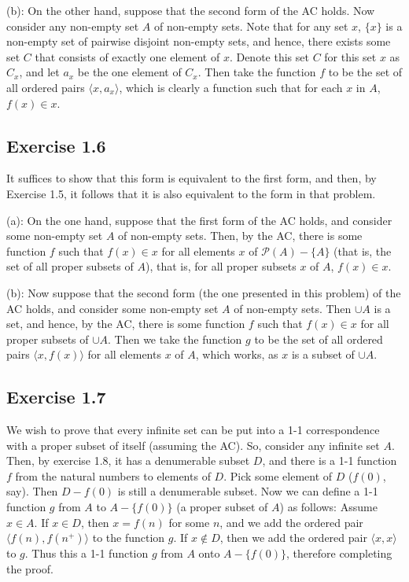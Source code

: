 \documentclass{article}
\theoremstyle{definition}
\begin{document}
(b): On the other hand, suppose that the second form of the AC holds. Now consider any non-empty set $A$ of non-empty sets. 
Note that for any set $x$, $\{x\}$ is a non-empty set of pairwise disjoint non-empty sets, and hence, there exists some set $C$ that consists of exactly one element 
of $x$. Denote this set $C$ for this set $x$ as $C_x$, and let $a_x$ be the one element of $C_x$. Then take the function $f$ to be the set of all ordered pairs
$\langle x,a_x\rangle$, which is clearly a function such that for each $x$ in $A$, $f(x)\in x$.

\subsection*{Exercise 1.6}
It suffices to show that this form is equivalent to the first form, and then, by Exercise 1.5, it follows that it is also equivalent to the form in that 
problem.

(a): On the one hand, suppose that the first form of the AC holds, and consider some non-empty set $A$ of non-empty sets. 
Then, by the AC, there is some function $f$ such that 
$f(x)\in x$ for all elements $x$ of $\mathcal{P}(A)-\{A\}$ (that is, the set of all proper subsets of $A$), that is, for all proper subsets $x$ of $A$, 
$f(x)\in x$.

(b): Now suppose that the second form (the one presented in this problem) 
of the AC holds, and consider some non-empty set $A$ of non-empty sets. Then $\cup A$ is a set, and hence, by the 
AC, there is some function $f$ such that $f(x)\in x$ for all proper subsets of $\cup A$. Then we take the function $g$ to be the set of all ordered pairs 
$\langle x,f(x)\rangle$ for all elements $x$ of $A$, which works, as $x$ is a subset of $\cup A$. 

\subsection*{Exercise 1.7}
We wish to prove that every infinite set can be put into a 1-1 correspondence with a proper subset of itself  (assuming the AC). So, consider any infinite set $A$. Then, by exercise 1.8,
it has a denumerable subset $D$, and there is a 1-1 function $f$ from the natural numbers to elements of $D$. Pick some element of $D$ ($f(0)$, say). Then 
$D-f(0)$ is still a denumerable subset. Now we can define a 1-1 function $g$ from $A$ to $A-\{f(0)\}$ (a proper subset of $A$) as follows: 
Assume $x\in A$. If $x\in D$, then $x=f(n)$ for some $n$, and we add the ordered pair $\langle f(n),f(n^+)\rangle$ to the function $g$. If $x\notin D$, 
then we add the ordered pair $\langle x,x\rangle$ to $g$. Thus this a 1-1 function $g$ from $A$ onto $A-\{f(0)\}$, therefore completing the proof. 
\end{document}
